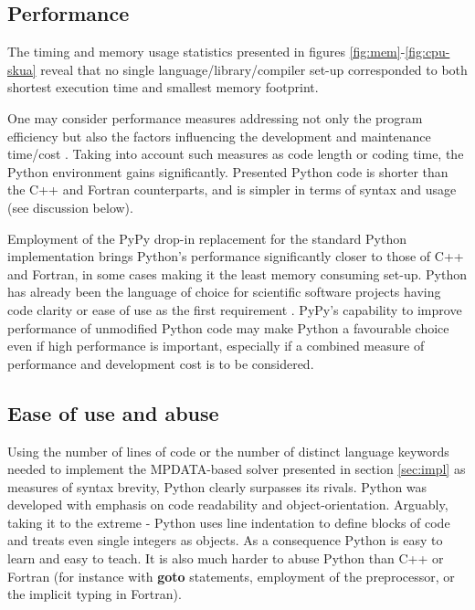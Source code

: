 \documentclass[final,5p,times,twocolumn]{elsarticle}
\newcommand{\prog}[1]{{\rm\bf#1}}
\begin{document}
  \subsection{Performance}
  
  The timing and memory usage statistics presented in figures \ref{fig:mem}-\ref{fig:cpu-skua}
    reveal that no single language/library/compiler set-up 
    corresponded to both shortest execution time and smallest memory footprint.

  One may consider performance measures addressing not only the program efficiency but also 
    the factors influencing the development and maintenance time/cost 
    \citep[of particular importance in scientific computing,][]{Wilson_2006}.
  Taking into account such measures as code length or coding time,
    the Python environment gains significantly.
  Presented Python code is shorter than the C++ and Fortran counterparts,
    and is simpler in terms of syntax and usage (see discussion below).

  Employment of the PyPy drop-in replacement for the standard Python implementation brings 
    Python's performance significantly closer to those of C++ and Fortran, in some
    cases making it the least memory consuming set-up.
  Python has already been the language of choice for scientific software projects having code clarity 
    or ease of use as the first requirement \citep[see e.g.][]{Barnes_and_Jones_2011}.
  PyPy's capability to improve performance of unmodified Python code may 
    make Python a favourable choice even if high performance is important, especially
    if a combined measure of performance and development cost is to be considered. 

  \subsection{Ease of use and abuse}

  Using the number of lines of code or the number of distinct language keywords
    needed to implement the MPDATA-based
    solver presented in section \ref{sec:impl} as measures of syntax 
    brevity, Python clearly surpasses its rivals.
  Python was developed with emphasis on code readability and object-orientation.
  Arguably, taking it to the extreme - Python uses line indentation to define 
    blocks of code and treats even single integers as objects.
  As a consequence Python is easy to learn and easy to teach.
  It is also much harder to abuse Python than C++ or Fortran
    (for instance with \prog{goto} statements, employment of the preprocessor,
    or the implicit typing in Fortran).
\end{document}
